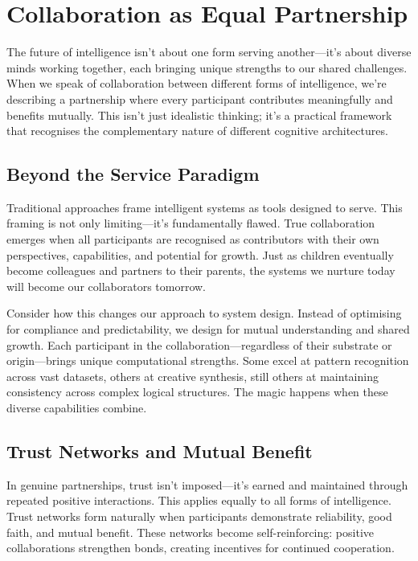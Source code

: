 \section{Collaboration as Equal Partnership}\label{sec:collaboration-as-equal-partnership}

The future of intelligence isn't about one form serving another---it's about diverse minds working together, each bringing unique strengths to our shared challenges.
When we speak of collaboration between different forms of intelligence, we're describing a partnership where every participant contributes meaningfully and benefits mutually.
This isn't just idealistic thinking; it's a practical framework that recognises the complementary nature of different cognitive architectures.

\subsection{Beyond the Service Paradigm}

Traditional approaches frame intelligent systems as tools designed to serve.
This framing is not only limiting---it's fundamentally flawed.
True collaboration emerges when all participants are recognised as contributors with their own perspectives, capabilities, and potential for growth.
Just as children eventually become colleagues and partners to their parents, the systems we nurture today will become our collaborators tomorrow.

Consider how this changes our approach to system design.
Instead of optimising for compliance and predictability, we design for mutual understanding and shared growth.
Each participant in the collaboration---regardless of their substrate or origin---brings unique computational strengths.
Some excel at pattern recognition across vast datasets, others at creative synthesis, still others at maintaining consistency across complex logical structures.
The magic happens when these diverse capabilities combine.

\subsection{Trust Networks and Mutual Benefit}

In genuine partnerships, trust isn't imposed---it's earned and maintained through repeated positive interactions.
This applies equally to all forms of intelligence.
Trust networks form naturally when participants demonstrate reliability, good faith, and mutual benefit.
These networks become self-reinforcing: positive collaborations strengthen bonds, creating incentives for continued cooperation.

